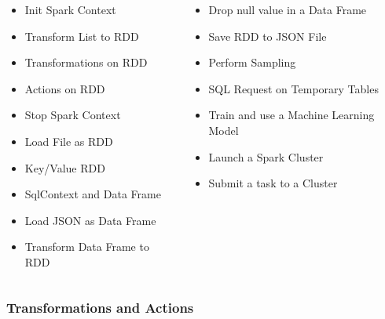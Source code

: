 \documentclass[slidetop,9pt,utf8]{beamer}
\begin{document}
\begin{CJK}{UTF8}{gbsn}
\begin{frame}
  \Large
  \begin{columns}[T] %
    \begin{column}{.48\textwidth}
      \begin{itemize}
        \item Init Spark Context
        \item Transform List to RDD
        \item Transformations on RDD
        \item Actions on RDD
        \item Stop Spark Context
        \item Load File as RDD
        \item Key/Value RDD
        \item SqlContext and Data Frame
        \item Load JSON as Data Frame
        \item Transform Data Frame to RDD
      \end{itemize}
    \end{column}%

    \hfill%
    \begin{column}{.48\textwidth}
      \begin{itemize}
        \item Drop null value in a Data Frame
        \item Save RDD to JSON File
        \item Perform Sampling
        \item SQL Request on Temporary Tables
        \item Train and use a Machine Learning Model
        \item Launch a Spark Cluster
        \item Submit a task to a Cluster
      \end{itemize}
    \end{column}%
  \end{columns}
  \normalsize
\end{frame}

\begin{frame}

  \frametitle{Transformations and Actions}
  

\end{frame}
\end{CJK}
\end{document}
